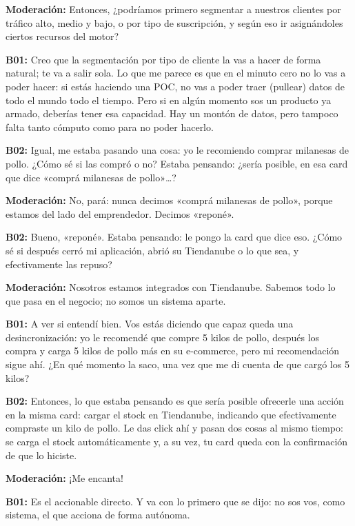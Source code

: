 \noindent\textbf{Moderación:} Entonces, ¿podríamos primero segmentar a nuestros clientes por tráfico alto, medio y bajo, o por tipo de suscripción, y según eso ir asignándoles ciertos recursos del motor?

\noindent\textbf{B01:} Creo que la segmentación por tipo de cliente la vas a hacer de forma natural; te va a salir sola. Lo que me parece es que en el minuto cero no lo vas a poder hacer: si estás haciendo una POC, no vas a poder traer (pullear) datos de todo el mundo todo el tiempo. Pero si en algún momento sos un producto ya armado, deberías tener esa capacidad. Hay un montón de datos, pero tampoco falta tanto cómputo como para no poder hacerlo.

\noindent\textbf{B02:} Igual, me estaba pasando una cosa: yo le recomiendo comprar milanesas de pollo. ¿Cómo sé si las compró o no? Estaba pensando: ¿sería posible, en esa card que dice «comprá milanesas de pollo»…?

\noindent\textbf{Moderación:} No, pará: nunca decimos «comprá milanesas de pollo», porque estamos del lado del emprendedor. Decimos «reponé».

\noindent\textbf{B02:} Bueno, «reponé». Estaba pensando: le pongo la card que dice eso. ¿Cómo sé si después cerró mi aplicación, abrió su Tiendanube o lo que sea, y efectivamente las repuso?

\noindent\textbf{Moderación:} Nosotros estamos integrados con Tiendanube. Sabemos todo lo que pasa en el negocio; no somos un sistema aparte.

\noindent\textbf{B01:} A ver si entendí bien. Vos estás diciendo que capaz queda una desincronización: yo le recomendé que compre 5 kilos de pollo, después los compra y carga 5 kilos de pollo más en su e-commerce, pero mi recomendación sigue ahí. ¿En qué momento la saco, una vez que me di cuenta de que cargó los 5 kilos?

\noindent\textbf{B02:} Entonces, lo que estaba pensando es que sería posible ofrecerle una acción en la misma card: cargar el stock en Tiendanube, indicando que efectivamente compraste un kilo de pollo. Le das click ahí y pasan dos cosas al mismo tiempo: se carga el stock automáticamente y, a su vez, tu card queda con la confirmación de que lo hiciste.

\noindent\textbf{Moderación:} ¡Me encanta!

\noindent\textbf{B01:} Es el accionable directo. Y va con lo primero que se dijo: no sos vos, como sistema, el que acciona de forma autónoma.

